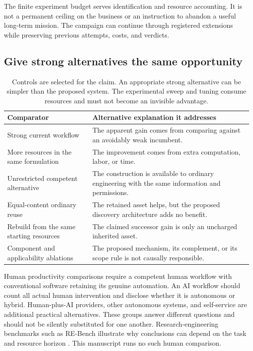 \documentclass[11pt,letterpaper]{article}
\theoremstyle{remark}\newtheorem{remark}{Remark}[section]
\begin{document}
The finite experiment budget serves identification and resource accounting.
It is not a permanent ceiling on the business or an instruction to abandon a useful long-term mission.
The campaign can continue through registered extensions while preserving previous attempts, costs, and verdicts.

\subsection{Give strong alternatives the same opportunity}
\begin{table}[t]
\centering\small
\begin{tabularx}{\linewidth}{P{3.25cm}Y}
\toprule
Comparator & Alternative explanation it addresses\\
\midrule
Strong current workflow & The apparent gain comes from comparing against an avoidably weak incumbent.\\
More resources in the same formulation & The improvement comes from extra computation, labor, or time.\\
Unrestricted competent alternative & The construction is available to ordinary engineering with the same information and permissions.\\
Equal-content ordinary reuse & The retained asset helps, but the proposed discovery architecture adds no benefit.\\
Rebuild from the same starting resources & The claimed successor gain is only an uncharged inherited asset.\\
Component and applicability ablations & The proposed mechanism, its complement, or its scope rule is not causally responsible.\\
\bottomrule
\end{tabularx}
\caption{Controls are selected for the claim. An appropriate strong alternative can be simpler than the proposed system.
The experimental sweep and tuning consume resources and must not become an invisible advantage.}
\label{tab:controls}
\end{table}

Human productivity comparisons require a competent human workflow with conventional software retaining its genuine automation.
An AI workflow should count all actual human intervention and disclose whether it is autonomous or hybrid.
Human-plus-AI providers, other autonomous systems, and self-service are additional practical alternatives.
These groups answer different questions and should not be silently substituted for one another.
Research-engineering benchmarks such as RE-Bench illustrate why conclusions can depend on the task and resource horizon \citep{wijk2025rebench}.
This manuscript runs no such human comparison.
\end{document}
